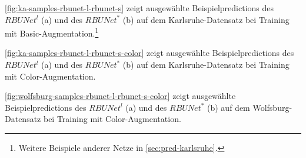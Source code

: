 \autoref{fig:ka-samples-rbunet-l-rbunet-s} zeigt ausgewählte Beispielpredictions des $RBUNet^l$ (a) und 
des $RBUNet^*$ (b) auf dem Karlsruhe-Datensatz bei Training mit Basic-Augmentation.\footnote{Weitere Beispiele anderer Netze in \autoref{sec:pred-karlsruhe}.}

\autoref{fig:ka-samples-rbunet-l-rbunet-s-color} zeigt ausgewählte Beispielpredictions des $RBUNet^l$ (a) und 
des $RBUNet^*$ (b) auf dem Karlsruhe-Datensatz bei Training mit Color-Augmentation.

\autoref{fig:wolfsburg-samples-rbunet-l-rbunet-s-color} zeigt ausgewählte Beispielpredictions des $RBUNet^l$ (a) und 
des $RBUNet^*$ (b) auf dem Wolfsburg-Datensatz bei Training mit Color-Augmentation.

\begin{figure}[h]
	\centering
	\begin{subfigure}{.4\textwidth}
		\centering

\end{subfigure}
\end{figure}
